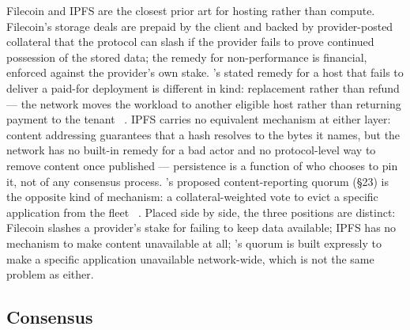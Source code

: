 Filecoin \citep{filecoin2017} and IPFS \citep{benet2014ipfs} are the closest prior art for hosting
rather than compute. Filecoin's storage deals are prepaid by the client and backed by provider-posted
collateral that the protocol can slash if the provider fails to prove continued possession of the
stored data; the remedy for non-performance is financial, enforced against the provider's own stake.
\Flux's stated remedy for a host that fails to deliver a paid-for deployment is different in kind:
replacement rather than refund — the network moves the workload to another eligible host rather than
returning payment to the tenant \planned\ . IPFS carries no equivalent mechanism at
either layer: content addressing guarantees that a hash resolves to the bytes it names, but the network
has no built-in remedy for a bad actor and no protocol-level way to remove content once published —
persistence is a function of who chooses to pin it, not of any consensus process. \Flux's proposed
content-reporting quorum (§23) is the opposite kind of mechanism: a collateral-weighted vote to evict a
specific application from the fleet \planned\ . Placed side by side, the three positions
are distinct: Filecoin slashes a provider's stake for failing to keep data available; IPFS has no
mechanism to make content unavailable at all; \Flux's quorum is built expressly to make a specific
application unavailable network-wide, which is not the same problem as either.

\subsection{Consensus}

